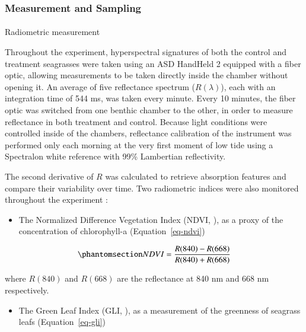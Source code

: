 \documentclass[
  number]{elsarticle}
\makeatletter
\let\oldparagraph\paragraph
\renewcommand{\paragraph}{
    \@ifstar
      \xxxParagraphStar
      \xxxParagraphNoStar
  }
\newcommand{\xxxParagraphStar}[1]{\oldparagraph*{#1}\mbox{}}
\newcommand{\xxxParagraphNoStar}[1]{\oldparagraph{#1}\mbox{}}
\providecommand{\tightlist}{%
  \setlength{\itemsep}{0pt}\setlength{\parskip}{0pt}}\usepackage{longtable,booktabs,array}
\makeatother
\begin{document}
\subsubsection{Measurement and Sampling}\label{measurement-and-sampling}

\paragraph{Radiometric measurement}\label{radiometric-measurement}

Throughout the experiment, hyperspectral signatures of both the control
and treatment seagrasses were taken using an ASD HandHeld 2 equipped
with a fiber optic, allowing measurements to be taken directly inside
the chamber without opening it. An average of five reflectance spectrum
(\(R(\lambda)\)), each with an integration time of 544 ms, was taken
every minute. Every 10 minutes, the fiber optic was switched from one
benthic chamber to the other, in order to measure reflectance in both
treatment and control. Because light conditions were controlled inside
of the chambers, reflectance calibration of the instrument was performed
only each morning at the very first moment of low tide using a
Spectralon white reference with 99\% Lambertian reflectivity.

The second derivative of \(R\) was calculated to retrieve absorption
features and compare their variability over time. Two radiometric
indices were also monitored throughout the experiment :

\begin{itemize}
\tightlist
\item
  The Normalized Difference Vegetation Index (NDVI,
  \citep{rouse1974monitoring}), as a proxy of the concentration of
  chlorophyll-a (Equation~\ref{eq-ndvi})
\end{itemize}

\begin{equation}\phantomsection\label{eq-ndvi}{
NDVI = \frac{R(840)-R(668)}{R(840)+R(668)}
}\end{equation}

where \(R(840)\) and \(R(668)\) are the reflectance at 840 nm and 668 nm
respectively.

\begin{itemize}
\tightlist
\item
  The Green Leaf Index (GLI, \citep{louhaichi2001spatially}), as a
  measurement of the greenness of seagrass leafs (Equation~\ref{eq-gli})
\end{itemize}
\end{document}
